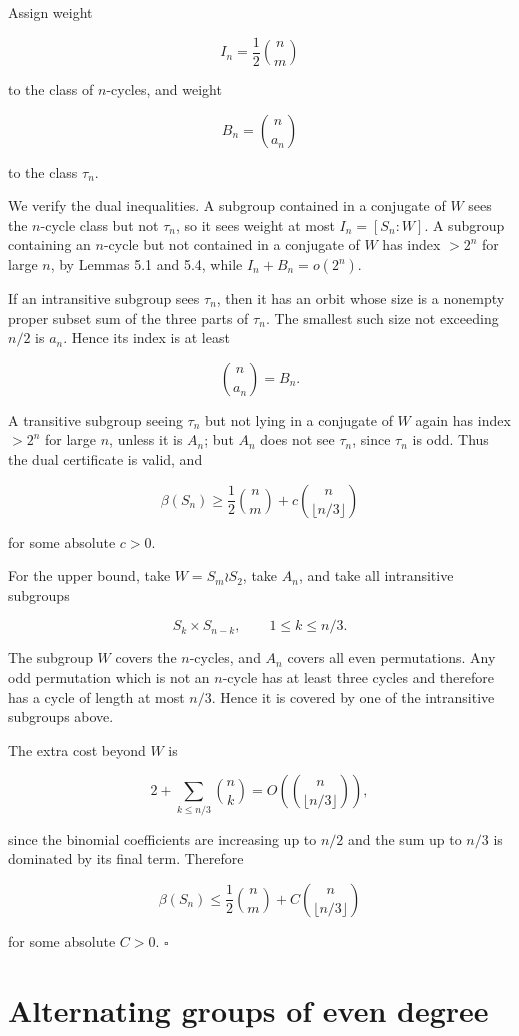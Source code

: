 \documentclass[11pt]{article}
\begin{document}
Assign weight

\[
I_n=\frac12\binom nm
\]

to the class of $n$-cycles, and weight

\[
B_n=\binom n{a_n}
\]

to the class $\tau_n$.

We verify the dual inequalities. A subgroup contained in a conjugate of $W$ sees the $n$-cycle class but not $\tau_n$, so it sees weight at most $I_n=[S_n:W]$. A subgroup containing an $n$-cycle but not contained in a conjugate of $W$ has index $>2^n$ for large $n$, by Lemmas 5.1 and 5.4, while $I_n+B_n=o(2^n)$.

If an intransitive subgroup sees $\tau_n$, then it has an orbit whose size is a nonempty proper subset sum of the three parts of $\tau_n$. The smallest such size not exceeding $n/2$ is $a_n$. Hence its index is at least

\[
\binom n{a_n}=B_n.
\]

A transitive subgroup seeing $\tau_n$ but not lying in a conjugate of $W$ again has index $>2^n$ for large $n$, unless it is $A_n$; but $A_n$ does not see $\tau_n$, since $\tau_n$ is odd. Thus the dual certificate is valid, and

\[
\beta(S_n)
\ge
\frac12\binom nm
+
c\binom n{\lfloor n/3\rfloor}
\]

for some absolute $c>0$.

For the upper bound, take $W=S_m\wr S_2$, take $A_n$, and take all intransitive subgroups

\[
S_k\times S_{n-k},
\qquad
1\le k\le n/3.
\]

The subgroup $W$ covers the $n$-cycles, and $A_n$ covers all even permutations. Any odd permutation which is not an $n$-cycle has at least three cycles and therefore has a cycle of length at most $n/3$. Hence it is covered by one of the intransitive subgroups above.

The extra cost beyond $W$ is

\[
2+\sum_{k\le n/3}\binom nk
=
O\!\left(\binom n{\lfloor n/3\rfloor}\right),
\]

since the binomial coefficients are increasing up to $n/2$ and the sum up to $n/3$ is dominated by its final term. Therefore

\[
\beta(S_n)
\le
\frac12\binom nm
+
C\binom n{\lfloor n/3\rfloor}
\]

for some absolute $C>0$. $\square$

\section{Alternating groups of even degree}
\end{document}
